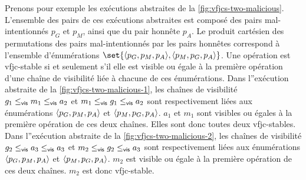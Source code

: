 Prenons pour exemple les exécutions abstraites de la \autoref{fig:vfjcs-two-malicious}.
L'ensemble des pairs de ces exécutions abstraites est composé des pairs mal-intentionnés $p_G$ et $p_M$, ainsi que du pair honnête $p_A$.
Le produit cartésien des permutations des pairs mal-intentionnés par les pairs honnêtes correspond à l'ensemble d'énumérations $\set{\tuple*{p_G, p_M, p_A}, \tuple*{p_M, p_G, p_A}}$.
Une opération est vfjc-stable si et seulement s'il elle est visible ou égale à la première opération d'une chaîne de visibilité liée à chacune de ces énumérations.
Dans l''exécution abstraite de la \autoref{fig:vfjcs-two-malicious-1}, les chaînes de visibilité $g_1 \viseq m_1 \viseq a_2$ et $m_1 \viseq g_1 \viseq a_2$ sont respectivement liées aux énumérations $\tuple*{p_G, p_M, p_A}$ et $\tuple*{p_M, p_G, p_A}$.
$a_1$ et $m_1$ sont visibles ou égales à la première opération de ces deux chaînes.
Elles sont donc toutes deux vfjc-stables.
Dans l''exécution abstraite de la \autoref{fig:vfjcs-two-malicious-2}, les chaînes de visibilité $g_2 \viseq a_3 \viseq a_3$ et $m_2 \viseq g_2 \viseq a_3$ sont respectivement liées aux énumérations $\tuple*{p_G, p_M, p_A}$ et $\tuple*{p_M, p_G, p_A}$.
$m_2$ est visible ou égale à la première opération de ces deux chaînes.
$m_2$ est donc vfjc-stable.

